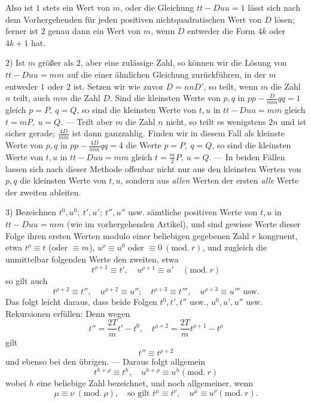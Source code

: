 Also ist \(1\) stets ein Wert von \(m\), oder die Gleichung \(tt-Duu=1\) lässt sich nach dem Vorhergehenden für jeden positiven nichtquadratischen Wert von \(D\) lösen; ferner ist \(2\) genau dann ein Wert von \(m\), wenn \(D\) entweder die Form \(4k\) oder \(4k+1\) hat.

2) Ist \(m\) größer als \(2\), aber eine zulässige Zahl, so können wir die Lösung von \(tt-Duu=mm\) auf die einer ähnlichen Gleichung zurückführen, in der \(m\) entweder \(1\) oder \(2\) ist. Setzen wir wie zuvor \(D=nnD'\), so teilt, wenn \(m\) die Zahl \(n\) teilt, auch \(mm\) die Zahl \(D\). Sind die kleinsten Werte von \(p,q\) in \(pp-\frac{D}{mm}qq=1\) gleich \(p=P,\ q=Q\), so sind die kleinsten Werte von \(t,u\) in \(tt-Duu=mm\) gleich \(t=mP,\ u=Q\). --- Teilt aber \(m\) die Zahl \(n\) nicht, so teilt es wenigstens \(2n\) und ist sicher gerade; \(\frac{4D}{mm}\) ist dann ganzzahlig. Finden wir in diesem Fall als kleinste Werte von \(p,q\) in \(pp-\frac{4D}{mm}qq=4\) die Werte \(p=P,\ q=Q\), so sind die kleinsten Werte von \(t,u\) in \(tt-Duu=mm\) gleich \(t=\frac{m}{2}P,\ u=Q\). --- In beiden Fällen lassen sich nach dieser Methode offenbar nicht nur aus den kleinsten Werten von \(p,q\) die kleinsten Werte von \(t,u\), sondern aus \textit{allen} Werten der ersten \textit{alle} Werte der zweiten ableiten.

3) Bezeichnen \(t^0,u^0;\ t',u';\ t'',u''\) usw. sämtliche positiven Werte von
\(t,u\) in \(tt-Duu=mm\) (wie im vorhergehenden Artikel), und sind gewisse Werte dieser Folge ihren ersten Werten modulo einer beliebigen gegebenen Zahl \(r\) kongruent, etwa \(t^\rho\equiv t\) (oder \(\equiv m\)), \(u^\rho\equiv u^0\) oder \(\equiv0\ (\mathrm{mod.}\ r)\), und zugleich die unmittelbar folgenden Werte den zweiten, etwa
\[
t^{\rho+1}\equiv t',\quad u^{\rho+1}\equiv u'\quad(\mathrm{mod.}\ r)
\]
so gilt auch
\[
t^{\rho+2}\equiv t'',\quad u^{\rho+2}\equiv u'';\quad t^{\rho+3}\equiv t''',\quad u^{\rho+3}\equiv u'''\text{ usw.}
\]
Das folgt leicht daraus, dass beide Folgen \(t^0,t',t''\) usw., \(u^0,u',u''\) usw. Rekursionen erfüllen: Denn wegen
\[
t''=\frac{2T}{m}t'-t^0,\quad t^{\rho+2}=\frac{2T}{m}t^{\rho+1}-t^\rho
\]
gilt
\[
t''\equiv t^{\rho+2}
\]
und ebenso bei den übrigen. --- Daraus folgt allgemein
\[
t^{h+\rho}\equiv t^h,\quad u^{h+\rho}\equiv u^h(\mathrm{mod.}\ r)
\]
wobei \(h\) eine beliebige Zahl bezeichnet, und noch allgemeiner, wenn
\[
\mu\equiv\nu\ (\mathrm{mod.}\ \rho),\quad\text{so gilt }t^\mu\equiv t^\nu,\quad u^\mu\equiv u^\nu(\mathrm{mod.}\ r).
\]

